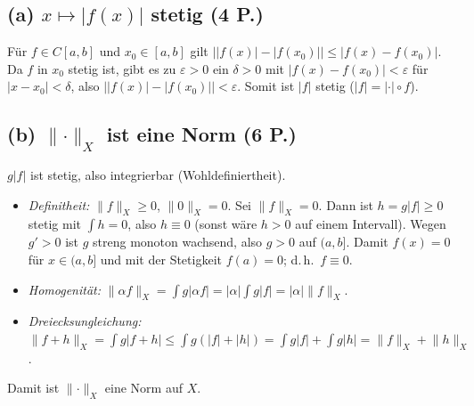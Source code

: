 \documentclass[11pt,a4paper]{article}
\newcommand{\norm}[1]{\lVert #1 \rVert}
\newcommand{\abs}[1]{\lvert #1 \rvert}
\begin{document}
\subsection*{(a) $x\mapsto\abs{f(x)}$ stetig \hfill (4 P.)}
Für $f\in C[a,b]$ und $x_0\in[a,b]$ gilt
$\bigl\lvert\abs{f(x)}-\abs{f(x_0)}\bigr\rvert\le\abs{f(x)-f(x_0)}$.
Da $f$ in $x_0$ stetig ist, gibt es zu $\varepsilon>0$ ein $\delta>0$ mit
$\abs{f(x)-f(x_0)}<\varepsilon$ für $\abs{x-x_0}<\delta$, also
$\bigl\lvert\abs{f(x)}-\abs{f(x_0)}\bigr\rvert<\varepsilon$. Somit ist
$\abs{f}$ stetig ($\abs{f}=\abs{\cdot}\circ f$).

\subsection*{(b) $\norm{\cdot}_X$ ist eine Norm \hfill (6 P.)}
$g\abs{f}$ ist stetig, also integrierbar (Wohldefiniertheit).

\begin{itemize}[leftmargin=1.6em,itemsep=1pt]
\item \emph{Definitheit:} $\norm{f}_X\ge0$, $\norm{0}_X=0$. Sei
$\norm{f}_X=0$. Dann ist $h=g\abs{f}\ge0$ stetig mit $\int h=0$, also $h\equiv0$
(sonst wäre $h>0$ auf einem Intervall). Wegen $g'>0$ ist $g$ streng monoton
wachsend, also $g>0$ auf $(a,b]$. Damit $f(x)=0$ für $x\in(a,b]$ und mit der
Stetigkeit $f(a)=0$; d.\,h.\ $f\equiv0$.
\item \emph{Homogenität:}
$\norm{\alpha f}_X=\int g\abs{\alpha f}=\abs{\alpha}\int g\abs{f}=\abs{\alpha}\norm{f}_X$.
\item \emph{Dreiecksungleichung:}
$\norm{f+h}_X=\int g\abs{f+h}\le\int g(\abs{f}+\abs{h})
=\int g\abs{f}+\int g\abs{h}=\norm{f}_X+\norm{h}_X$.
\end{itemize}
Damit ist $\norm{\cdot}_X$ eine Norm auf $X$.
\end{document}
